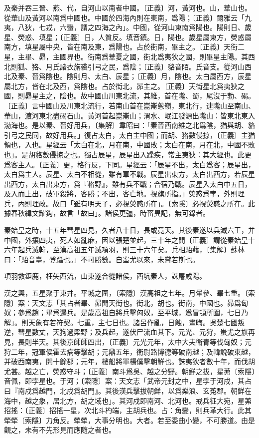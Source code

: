及秦并吞三晉、燕、代，自河山以南者中國。〔正義〕河，黃河也。山，華山也。從華山及黃河以南爲中國也。中國於四海內則在東南，爲陽；〔正義〕爾雅云「九夷，八狄，七戎，六蠻，謂之四海之內」。中國，從河山東南爲陽也。陽則日、歲星、熒惑、填星；〔正義〕日，人質反。填音鎮。日，陽也。歲星屬東方，熒惑屬南方，填星屬中央，皆在南及東，爲陽也。占於街南，畢主之。〔正義〕天街二星，主畢、昴，主國界也。街南爲華夏之國，街北爲夷狄之國，則畢星主陽。其西北則狐、狢、月氏諸衣旃裘引弓之民，爲陰；〔正義〕貉音陌。氏音支。從河山西北及秦、晉爲陰也。陰則月、太白、辰星；〔正義〕月，陰也。太白屬西方，辰星屬北方，皆在北及西，爲陰也。占於街北，昴主之。〔正義〕天街星北爲夷狄之國，則昴星主之，陰也。故中國山川東北流，其維，首在隴、蜀，尾沒于勃、碣。〔正義〕言中國山及川東北流行，若南山首在崑崙蔥嶺，東北行，連隴山至南山、華山，渡河東北盡碣石山。黃河首起崑崙山；渭水、岷江發源出隴山：皆東北東入渤海也。是以秦、晉好用兵，〔集解〕韋昭曰：「秦晉西南維之北爲陰，猶與胡、貉引弓之民同，故好用兵。」復占太白，太白主中國；而胡、狢數侵掠，〔正義〕主猶領也，入也。星經云「太白在北，月在南，中國敗；太白在南，月在北，中國不敗也」。是胡貉數侵掠之也。獨占辰星，辰星出入躁疾，常主夷狄：其大經也。此更爲客主人。〔正義〕更，格行反，下同。星經云：「辰星不出，太白爲客；辰星出，太白爲主人。辰星、太白不相從，雖有軍不戰。辰星出東方，太白出西方，若辰星出西方，太白出東方，爲『格野』，雖有兵不戰；合宿乃戰。辰星入太白中五日，及入而上出，破軍殺將，客勝；不出，客亡地。視旗所指。」熒惑爲孛，外則理兵，內則理政。故曰「雖有明天子，必視熒惑所在」。〔索隱〕必視熒惑之所在。此據春秋緯文耀鉤，故言「故曰」。諸侯更彊，時菑異記，無可錄者。

秦始皇之時，十五年彗星四見，久者八十日，長或竟天。其後秦遂以兵滅六王，并中國，外攘四夷，死人如亂麻，因以張楚並起，三十年之閒〔正義〕謂從秦始皇十六年起兵滅韓，至漢高祖五年滅項羽，則三十六年矣。兵相駘藉，〔集解〕蘇林曰：「駘音臺，登躡也。」不可勝數。自蚩尤以來，未嘗若斯也。

項羽救鉅鹿，枉矢西流，山東遂合從諸侯，西坑秦人，誅屠咸陽。

漢之興，五星聚于東井。平城之圍，〔索隱〕漢高祖之七年。月暈參、畢七重。〔索隱〕案：天文志「其占者畢、昴閒天街也。街北，胡也。街南，中國也。昴爲匈奴；參爲趙；畢爲邊兵。是歲高祖自將兵擊匈奴，至平城，爲冒頓所圍，七日乃解」。則天象有若符契。七重，主七日也。諸呂作亂，日蝕，晝晦。吳楚七國叛逆，彗星數丈，天狗過梁野；及兵起，遂伏尸流血其下。元光、元狩，蚩尤之旗再見，長則半天。其後京師師四出，〔正義〕元光元年，太中大夫衞青等伐匈奴；元狩二年，冠軍侯霍去病等擊胡；元鼎五年，衞尉路博德等破南越；及韓說破東越，并破西南夷，開十餘郡；元年，樓船將軍楊僕擊朝鮮也。誅夷狄者數十年，而伐胡尤甚。越之亡，熒惑守斗；〔正義〕南斗爲吳、越之分野。朝鮮之拔，星茀〔索隱〕音佩，即孛星也。于河；〔索隱〕案：天文志「武帝元封之中，星孛于河戍，其占曰『南戍爲越門，北戍爲胡門』。其後漢兵擊拔朝鮮，以爲樂浪、玄菟郡。朝鮮在海中，越之象，居北方，胡之域也」。其河戍即南河、北河也。戒兵征大宛，星茀招搖：〔正義〕招搖一星，次北斗杓端，主胡兵也。占：角變，則兵革大行。此其犖犖〔索隱〕力角反。犖犖，大事分明也。大者。若至委曲小變，不可勝道。由是觀之，未有不先形見而應隨之者也。

